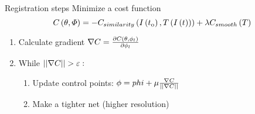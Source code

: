 \begin{frame}{Registration steps}
		Minimize a cost function
		\begin{equation}
			\mathnormal{C\left(\theta ,\Phi \right)=-C_{similarity}\left(I\left(t_{0}\right), T\left(I\left(t\right) \right)\right) + \lambda C_{smooth}\left(T\right)
			}
		\end{equation}
		
		
		\begin{center}
			
			\begin{enumerate}
				\item Calculate gradient $\mathnormal{\nabla C=\frac{\partial C\left(\theta ,{\phi }_{l}\right)}{\partial {\phi }_{l}}}$
				\item While $\mathnormal{\left| \left| \nabla C \right| \right| > \varepsilon} :$
				\begin{enumerate}
					\item Update control points: $\mathnormal{\phi = phi + \mu \frac{\nabla C}{\left| \left| \nabla C \right| \right|} }$
					\item Make a tighter net (higher resolution)
				\end{enumerate}
			\end{enumerate}
		\end{center}
		
		
		
\end{frame}